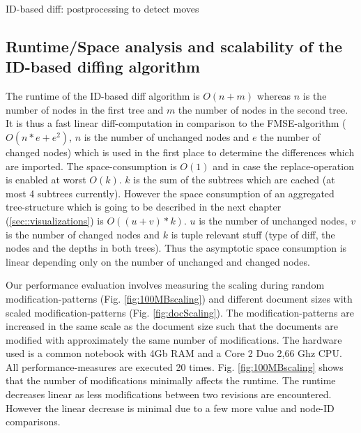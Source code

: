 \begin{algorithm}[Hhtbp]
\BlankLine
{}
\caption{ID-based diff: postprocessing to detect moves}\label{diffPostprocessing}
\end{algorithm}

\subsection{Runtime/Space analysis and scalability of the ID-based diffing algorithm}
The runtime of the ID-based diff algorithm is $O(n+m)$ whereas $n$ is the number of nodes in the first tree and $m$ the number of nodes in the second tree. It is thus a fast linear diff-computation in comparison to the FMSE-algorithm ($O(n*e+e^2)$, $n$ is the number of unchanged nodes and $e$ the number of changed nodes) which is used in the first place to determine the differences which are imported. The space-consumption is $O(1)$ and in case the replace-operation is enabled at worst $O(k)$. $k$ is the sum of the subtrees which are cached (at most 4 subtrees currently). However the space consumption of an aggregated tree-structure which is going to be described in the next chapter (\ref{sec::visualizations}) is $O((u+v)*k)$. $u$ is the number of unchanged nodes, $v$ is the number of changed nodes and $k$ is tuple relevant stuff (type of diff, the nodes and the depths in both trees). Thus the asymptotic space consumption is linear depending only on the number of unchanged and changed nodes.

Our performance evaluation involves measuring the scaling during random modification-patterns (Fig. \ref{fig:100MBscaling}) and different document sizes with scaled modification-patterns (Fig. \ref{fig:docScaling}). The modification-patterns are increased in the same scale as the document size such that the documents are modified with approximately the same number of modifications. The hardware used is a common notebook with 4Gb RAM and a Core 2 Duo 2,66 Ghz CPU. All performance-measures are executed 20 times. Fig. \ref{fig:100MBscaling} shows that the number of modifications minimally affects the runtime. The runtime decreases linear as less modifications between two revisions are encountered. However the linear decrease is minimal due to a few more value and node-ID comparisons.


